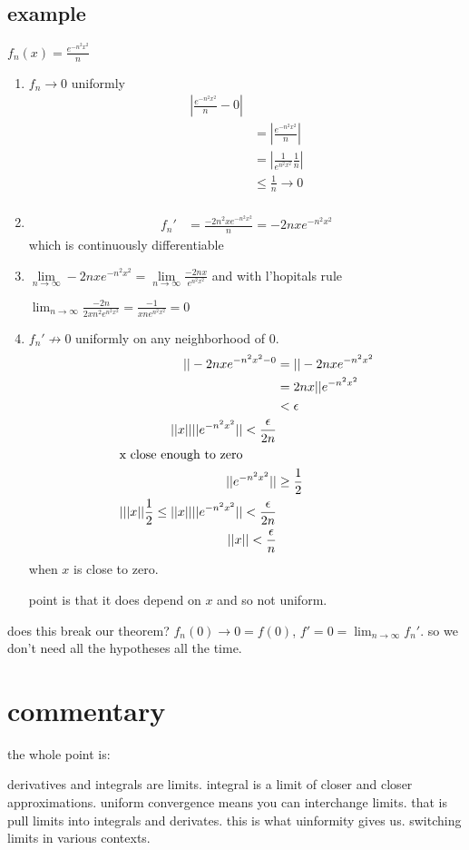 \documentclass[letterpaper]{article}
\begin{document}
\subsection*{example}
$f_n(x)=\frac{e^{-n^2x^2}}{n}$
\begin{enumerate}
\item
$f_n\to0$ uniformly
\begin{align*}
  |\frac{e^{-n^2x^2}}{n}-0|\\
  &=|\frac{e^{-n^2x^2}}{n}|\\
  &=|\frac{1}{e^{n^2x^2}}\frac{1}{n}|\\
  &\le \frac{1}{n}\to 0\\
\end{align*}
\item
\begin{align*}
  f_n'&=\frac{-2n^2xe^{-n^2x^2}}{n}=-2nxe^{-n^2x^2}
\end{align*}
which is continuously differentiable
\item
$\lim\limits_{n\to\infty}-2nxe^{-n^2x^2}
=\lim\limits_{n\to\infty}\frac{-2nx}{e^{n^2x^2}}$
and with  l'hopitals rule

$\lim_{n\to\infty}\frac{-2n}{2xn^2e^{n^2x^2}}=\frac{-1}{xne^{n^2x^2}}=0$
\item
$f_n'\not\to 0$ uniformly on any neighborhood of $0$. 
\begin{align*}
  ||-2nxe^{-n^2x^2-0}
  &=||-2nxe^{-n^2x^2}\\
  &=2nx||e^{-n^2x^2}\\
  &<\epsilon\\
  ||x||||e^{-n^2x^2}||<\frac{\epsilon}{2n}\\
  \intertext{x close enough to zero}
  ||e^{-n^2x^2}||&\ge \frac{1}{2}\\
  |||x||\frac{1}{2}\le ||x||||e^{-n^2x^2}||<\frac{\epsilon}{2n}\\
  ||x||<\frac{\epsilon}{n}
\end{align*}
when $x$ is close to zero.

point is that it does depend on $x$ and so not uniform.
\end{enumerate}
does this break our theorem?
$f_n(0)\to0=f(0)$, $f'=0=\lim_{n\to\infty}f_n'$. so we don't need all the hypotheses all the time.

\section*{commentary}
the whole point is:

derivatives and integrals are limits. integral is a limit of closer and closer approximations. uniform convergence means you can interchange limits. that is pull limits into integrals and derivates. this is what uinformity gives us. switching limits in various contexts.
\end{document}
